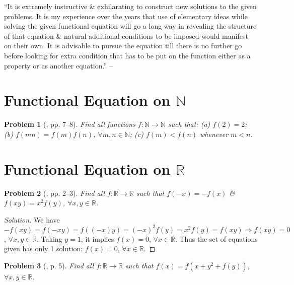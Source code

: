 \documentclass{article}
\numberwithin{equation}{section}
\newtheorem{problem}{Problem}[section]
\begin{document}
``It is extremely instructive \& exhilarating to construct new solutions to the given problems. It is my experience over the years that use of elementary ideas while solving the given functional equation will go a long way in revealing the structure of that equation \& natural additional conditions to be imposed would manifest on their own. It is advisable to pursue the equation till there is no further go before looking for extra condition that has to be put on the function either as a property or as another equation.'' -- \cite[p. 5]{Venkatachala2013}


\section{Functional Equation on $\mathbb{N}$}

\begin{problem}[\cite{Venkatachala2013}, pp. 7--8]
	Find all functions $f:\mathbb{N}\to\mathbb{N}$ such that: (a) $f(2) = 2$; (b) $f(mn) = f(m)f(n)$, $\forall m,n\in\mathbb{N}$; (c) $f(m) < f(n)$ whenever $m < n$.
\end{problem}


\section{Functional Equation on $\mathbb{R}$}

\begin{problem}[\cite{Venkatachala2013}, pp. 2--3]
	Find all $f:\mathbb{R}\to\mathbb{R}$ such that $f(-x) = -f(x)$ \& $f(xy) = x^2f(y)$, $\forall x,y\in\mathbb{R}$.
\end{problem}

\begin{proof}[Solution]
	We have $-f(xy) = f(-xy) = f((-x)y) = (-x)^2f(y) = x^2f(y) = f(xy)\Rightarrow f(xy) = 0$, $\forall x,y\in\mathbb{R}$. Taking $y = 1$, it implies $f(x) = 0$, $\forall x\in\mathbb{R}$. Thus the set of equations given has only 1 solution: $f(x) = 0$, $\forall x\in\mathbb{R}$.
\end{proof}

\begin{problem}[\cite{Dung_cac_phuong_phap_giai_toan_qua_cac_ky_thi_olympic_2022}, p. 5]
	Find all $f:\mathbb{R}\to\mathbb{R}$ such that $f(x) = f(x + y^2 + f(y))$, $\forall x,y\in\mathbb{R}$.
\end{problem}
\end{document}
